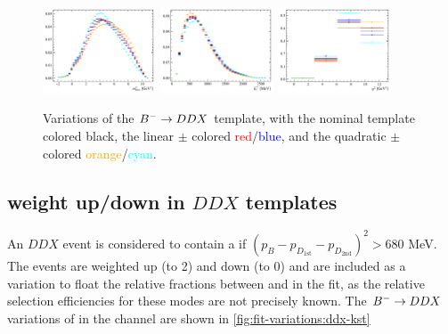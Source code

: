\begin{figure}[!htb]
    \centering
    \includegraphics[width=0.3\textwidth]{./figs-fit-fit-variations/histo-var/D0_iso_uDDMu__vs__D0_iso_uDDMu_dal_lm__vs__D0_iso_uDDMu_dal_lp__vs__D0_iso_uDDMu_dal_qm__vs__D0_iso_uDDMu_dal_qp__m2miss.pdf}
    \includegraphics[width=0.3\textwidth]{./figs-fit-fit-variations/histo-var/D0_iso_uDDMu__vs__D0_iso_uDDMu_dal_lm__vs__D0_iso_uDDMu_dal_lp__vs__D0_iso_uDDMu_dal_qm__vs__D0_iso_uDDMu_dal_qp__el.pdf}
    \includegraphics[width=0.3\textwidth]{./figs-fit-fit-variations/histo-var/D0_iso_uDDMu__vs__D0_iso_uDDMu_dal_lm__vs__D0_iso_uDDMu_dal_lp__vs__D0_iso_uDDMu_dal_qm__vs__D0_iso_uDDMu_dal_qp__q2.pdf}

    \caption{
        Variations of the
        ${{{B}^-}} \rightarrow DDX$ template,
        with the nominal template colored black,
        the linear $\pm$ colored \textcolor{red}{red}/\textcolor{blue}{blue},
        and the quadratic $\pm$ colored
        \textcolor{orange}{orange}/\textcolor{cyan}{cyan}.
    }
    \label{fig:fit-variations:ddx}
\end{figure}


\subsection{\Kstar weight up/down in $DDX$ templates}

An $DDX$ event is considered to contain a \Kstar if
$(p_B - p_{D_\text{1st}} - p_{D_\text{2nd}})^2 > 680$ MeV.
The \Kstar events are weighted up (to 2) and down (to 0) and are included as
a variation to float the relative fractions between \kaon and \Kstar in the fit,
as the relative selection efficiencies for these modes are not precisely known.
The ${{{B}^-}} \rightarrow DDX$ variations of \Kstar in the \Dz channel are shown
in \cref{fig:fit-variations:ddx-kst}

